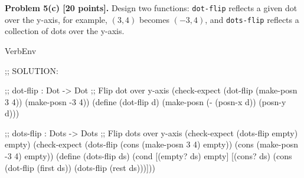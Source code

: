 \documentclass[12pt]{article}
\begin{document}

\newpage

\noindent
{\bf Problem 5(c) [20 points].}
%
Design two functions: {\tt dot-flip} reflects a given dot over the
y-axis, for example, $(3,4)$ becomes $(-3,4)$, and {\tt dots-flip}
reflects a collection of dots over the y-axis.
\begin{SaveVerbatim}{VerbEnv}

;; SOLUTION:
  
;; dot-flip : Dot -> Dot
;; Flip dot over y-axis
(check-expect (dot-flip (make-posn 3 4)) (make-posn -3 4))
(define (dot-flip d)
  (make-posn (- (posn-x d)) (posn-y d)))
  
;; dots-flip : Dots -> Dots
;; Flip dots over y-axis
(check-expect (dots-flip empty) empty)
(check-expect (dots-flip (cons (make-posn 3 4) empty))
              (cons (make-posn -3 4) empty))
(define (dots-flip ds)
  (cond [(empty? ds) empty]
        [(cons? ds) 
         (cons (dot-flip (first ds))
               (dots-flip (rest ds)))]))                   
\end{SaveVerbatim}

  
\newpage








\end{document}
